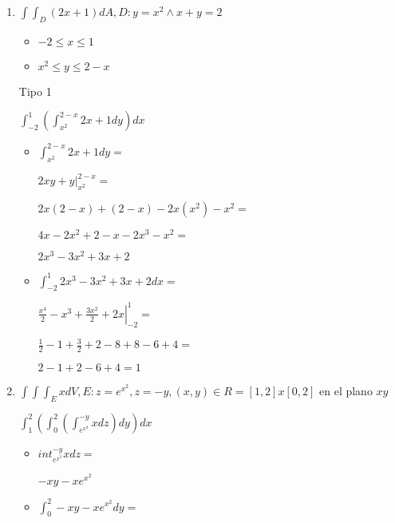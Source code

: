 \documentclass[../parcial.tex]{subfiles}
\begin{document}
    \begin{enumerate}
        \item $ \int \int_D (2x+1) dA, D: y = x^2 \wedge x+y=2$
        
            \begin{itemize}
                \item $-2 \leq x \leq 1$
                \item $ x^2 \leq y \leq 2 - x $
            \end{itemize}

            Tipo 1

            $\int_{-2}^1 (\int_{x^2}^{2-x} 2x+1 dy ) dx$

            \begin{itemize}
                \item $\int_{x^2}^{2-x} 2x+1 dy = $

                    $ \left. 2xy + y \right |_{x^2}^{2-x} = $

                    $ 2x(2-x) + (2-x) - 2x(x^2) - x^2 = $

                    $ 4x - 2x^2 + 2 - x - 2x^3 - x^2 = $

                    $ 2x^3 - 3x^2 + 3x + 2$

                \item $\int_{-2}^1 2x^3 - 3x^2 + 3x + 2 dx = $

                    $ \left. \frac{x^4}{2} - x^3 + \frac{3x^2}{2} + 2x \right |_{-2}^1 = $

                    $ \frac{1}{2} - 1 + \frac{3}{2} + 2 - 8 + 8 - 6 + 4 = $

                    $ 2 - 1 + 2 - 6 + 4 = 1 $

            \end{itemize}

        \item $\int \int \int_E x dV, E: z=e^{x^2}, z=-y, (x,y) \in R=[1,2]x[0,2] $ en el plano $xy$

            $ \int_1^2 (\int_0^2 (\int_{e^{x^2}}^{-y} x dz ) dy) dx $

            \begin{itemize}
                \item $int_{e^{x^2}}^{-y} x dz = $
                
                    $-xy - xe^{x^2}$

                \item $ \int_0^2 -xy - xe^{x^2} dy = $
                

\end{itemize}
\end{enumerate}
\end{document}
